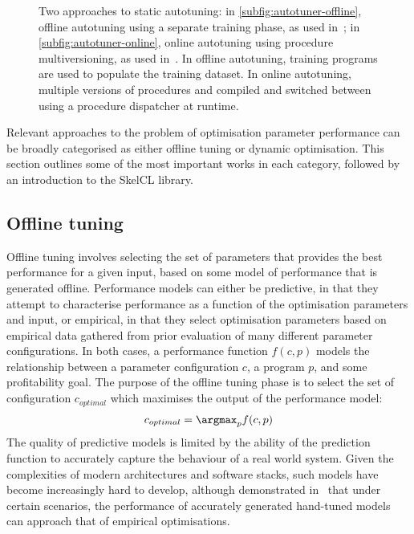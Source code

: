 \begin{figure*}[t]

\caption{Two approaches to static autotuning: in
  \ref{subfig:autotuner-offline}, offline autotuning using a separate
  training phase, as used in~\cite{Agakov, Fursin2011, Collins2013};
  in \ref{subfig:autotuner-online}, online autotuning using procedure
  multiversioning, as used in~\cite{Fursin2005}. In offline
  autotuning, training programs are used to populate the training
  dataset. In online autotuning, multiple versions of procedures and
  compiled and switched between using a procedure dispatcher at
  runtime.}
\label{fig:autotuners}
\end{figure*}

Relevant approaches to the problem of optimisation parameter
performance can be broadly categorised as either offline tuning or
dynamic optimisation. This section outlines some of the most important
works in each category, followed by an introduction to the SkelCL
library.

\subsection{Offline tuning}\label{subsec:offline-tuning}
Offline tuning involves selecting the set of parameters that provides
the best performance for a given input, based on some model of
performance that is generated offline. Performance models can either
be predictive, in that they attempt to characterise performance as a
function of the optimisation parameters and input, or empirical, in
that they select optimisation parameters based on empirical data
gathered from prior evaluation of many different parameter
configurations. In both cases, a performance function $f(c,p)$ models
the relationship between a parameter configuration $c$, a program $p$,
and some profitability goal. The purpose of the offline tuning phase
is to select the set of configuration $c_{optimal}$ which maximises
the output of the performance model:
\begin{align*}
  c_{optimal} = \argmax_{p}f(c,p)
\end{align*}
The quality of predictive models is limited by the ability of the
prediction function to accurately capture the behaviour of a real
world system. Given the complexities of modern architectures and
software stacks, such models have become increasingly hard to develop,
although \citeauthor{Yotov2003} demonstrated in~\cite{Yotov2003} that
under certain scenarios, the performance of accurately generated
hand-tuned models can approach that of empirical optimisations.

